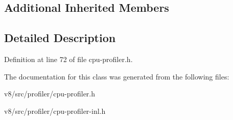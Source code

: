 \subsection*{Additional Inherited Members}


\subsection{Detailed Description}


Definition at line 72 of file cpu-\/profiler.\+h.



The documentation for this class was generated from the following files\+:\begin{DoxyCompactItemize}
\item 
v8/src/profiler/cpu-\/profiler.\+h\item 
v8/src/profiler/cpu-\/profiler-\/inl.\+h\end{DoxyCompactItemize}
